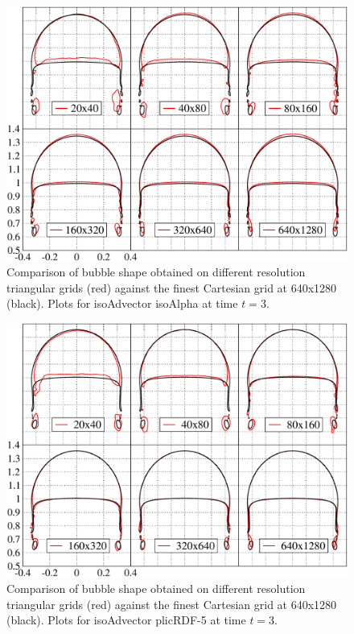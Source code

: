 \documentclass[review]{elsarticle}
\begin{document}
\begin{figure}[!h]
  \includegraphics[width=\textwidth]{figures/bubble_shape_t=3_compareOFisoAlpha_Fineststruct_vs_uns_grids.pdf}
  \caption{Comparison of bubble shape obtained on different resolution triangular grids (red) against the finest Cartesian grid at 640x1280 (black). Plots for isoAdvector isoAlpha at time $t=3$.}
  \label{fig:HB_compareOFisoAlpha_Fineststruct.vs.uns}
\end{figure}

\begin{figure}[!h]
  \includegraphics[width=\textwidth]{figures/bubble_shape_t=3_compareOFplicRDF5_Fineststruct_vs_uns_grids.pdf}
  \caption{Comparison of bubble shape obtained on different resolution triangular grids (red) against the finest Cartesian grid at 640x1280 (black). Plots for isoAdvector plicRDF-5 at time $t=3$.}
  \label{fig:HB_compareOFplicRDF5_Fineststruct.vs.uns}
\end{figure}
\end{document}
